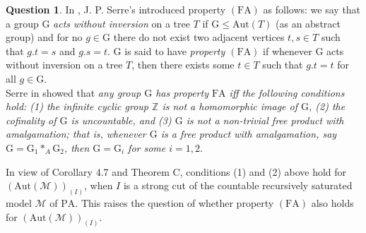 \documentclass[11pt]{article}
\theoremstyle{plain}
\theoremstyle{definition}
\newtheorem{q}{Question}
\newcommand{\M}{\mathcal{M}}
\newcommand{\G}{\mathrm{G}}
\newcommand{\A}{\mathrm{Aut}}
\newcommand{\pa}{\mathrm{PA}}
\begin{document}
\begin{q}
In \cite{ser},  J. P. Serre's introduced  property $(\mathrm{FA})$ as follows: we say that a group $\G$ \textit{acts without inversion} on a tree $T$ if $\G\leq\mathrm{Aut}(T)$ (as an abstract group) and for no $g\in\G $ there do not exist two adjacent vertices $t,s\in T$ such that $g.t=s$ and $g.s=t$. $\G$ is said to have \textit{property $(\mathrm{FA})$} if whenever $\G$ acts without inversion on a tree $T$, then  there exists some $t\in T$ such that $g.t=t$ for all $g\in \G$. \\
Serre in \cite{ser} showed  that \textit{any group  $\G$ has property $\mathrm{FA}$ iff the following conditions hold: (1) the infinite cyclic group $\mathbb{Z}$ is not a homomorphic image of $\G$, (2) the cofinality of $\G$ is uncountable, and (3) $\G$ is not a non-trivial free product with amalgamation; that is, whenever $\G$ is a free product with amalgamation, say $\G=\G_{1}\ast_{A}\G_{2}$, then $\G=\G_{i}$ for some $i=1,2$}.

In view of Corollary 4.7 and Theorem C, conditions (1) and (2) above hold for $(\A(\M))_{(I)}$, when $I$ is a strong cut of the countable recursively saturated model $\M$ of $\pa$. This raises the question of whether property  $(\mathrm{FA})$ also holds for $(\A(\M))_{(I)} $.

\end{q}
\end{document}
